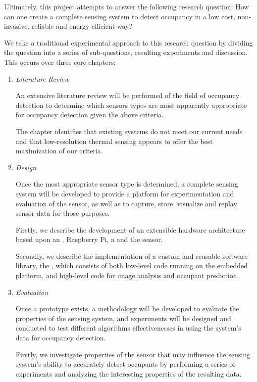 \documentclass[../thesis/thesis.tex]{subfiles}
\begin{document}
Ultimately, this project attempts to answer the following research question: How can one create a complete sensing system to detect occupancy in a low cost, non-invasive, reliable and energy efficient way?

We take a traditional experimental approach to this research question by dividing the question into a series of sub-questions, resulting experiments and discussion. This occurs over three core chapters:

\begin{enumerate}
\item \emph{Literature Review}

An extensive literature review will be performed of the field of occupancy detection to determine which sensors types are most apparently appropriate for occupancy detection given the above criteria. 

The chapter identifies that existing systems do not meet our current needs and that low-resolution thermal sensing appears to offer the best maximization of our criteria.

\item \emph{Design}

Once the most appropriate sensor type is determined, a complete sensing system will be developed to provide a platform for experimentation and evaluation of the sensor, as well as to capture, store, visualize and replay sensor data for those purposes.

Firstly, we describe the development of an extensible hardware architecture based upon an \ard, Raspberry Pi, a \pir and the \mlx sensor.

Secondly, we describe the implementation of a custom and reusable software library, the \tarl, which consists of both low-level code running on the \ard embedded platform, and high-level code for image analysis and occupant prediction.

\item \emph{Evaluation}

Once a prototype exists, a methodology will be developed to evaluate the properties of the sensing system, and experiments will be designed and conducted to test different algorithms effectivenesses in using the system's data for occupancy detection.

Firstly, we investigate properties of the sensor that may influence the sensing system's ability to accurately detect occupants by performing a series of experiments and analyzing the interesting properties of the resulting data.


\end{enumerate}
\end{document}
